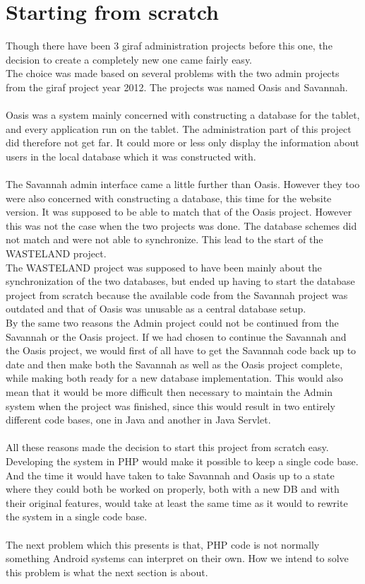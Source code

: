 \section{Starting from scratch}
Though there have been 3 \ac{giraf} administration projects before this one, the decision to create a completely new one came fairly easy.\\
The choice was made based on several problems with the two admin projects from the \ac{giraf} project year 2012. The projects was named Oasis and Savannah.\\
\\
Oasis was a system mainly concerned with constructing a database for the tablet, and every application run on the tablet. The administration part of this project did therefore not get far. It could more or less only display the information about users in the local database which it was constructed with.\\
\\
The Savannah admin interface came a little further than Oasis. However they too were also concerned with constructing a database, this time for the website version. It was supposed to be able to match that of the Oasis project. However this was not the case when the two projects was done. The database schemes did not match and were not able to synchronize. This lead to the start of the WASTELAND project.\\
The WASTELAND project was supposed to have been mainly about the synchronization of the two databases, but ended up having to start the database project from scratch because the available code from the Savannah project was outdated and that of Oasis was unusable as a central database setup.\\
By the same two reasons the Admin project could not be continued from the Savannah or the Oasis project. If we had chosen to continue the Savannah and the Oasis project, we would first of all have to get the Savannah code back up to date and then make both the Savannah as well as the Oasis project complete, while making both ready for a new database implementation. This would also mean that it would be more difficult then necessary to maintain the Admin system when the project was finished, since this would result in two entirely different code bases, one in Java and another in Java Servlet.\\
\\
All these reasons made the decision to start this project from scratch easy. Developing the system in PHP would make it possible to keep a single code base. And the time it would have taken to take Savannah and Oasis up to a state where they could both be worked on properly, both with a new DB and with their original features, would take at least the same time as it would to rewrite the system in a single code base.\\
\\
The next problem which this presents is that, PHP code is not normally something Android systems can interpret on their own. How we intend to solve this problem is what the next section is about.

